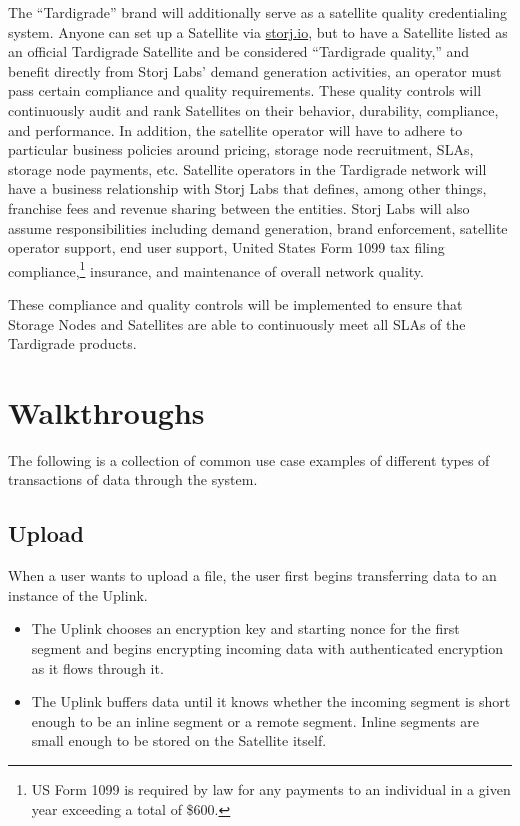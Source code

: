 \documentclass[8pt,fleqn,openany]{book}
\begin{document}
The ``Tardigrade'' brand will additionally serve as a satellite quality
credentialing system. Anyone can set up a Satellite via
\url{storj.io}, but to have a Satellite listed as an official Tardigrade
Satellite and be considered ``Tardigrade quality,'' and benefit directly from
Storj Labs' demand generation activities, an operator must pass
certain compliance and quality requirements.
These quality controls will continuously audit and rank Satellites on their
behavior, durability, compliance, and performance.
In addition, the satellite operator will have to adhere to particular business
policies around pricing, storage node recruitment, SLAs, storage node payments,
etc. Satellite operators in the Tardigrade network will have a business
relationship with Storj Labs that defines, among other things, franchise fees
and revenue sharing between the entities. Storj Labs will also assume
responsibilities including demand generation, brand enforcement, satellite
operator support, end user support, United States Form 1099 tax filing
compliance,\footnote{US Form 1099 is required by law for any payments to an
individual in a given year exceeding a total of \$600.}
insurance, and maintenance of overall network quality.

These compliance and quality controls will be implemented to ensure that
Storage Nodes and Satellites are able to continuously meet all SLAs of the
Tardigrade products.

\chapter{Walkthroughs}\label{chap:walkthroughs}

The following is a collection of common use case examples of different types of
transactions of data through the system.

\section{Upload}

When a user wants to upload a file, the user first begins transferring data to
an instance of the Uplink.

\begin{itemize}
\item The Uplink chooses an encryption key and starting nonce for
  the first segment and begins encrypting incoming data with authenticated
  encryption as it flows through it.
\item The Uplink buffers data until it knows whether the incoming segment is
short enough to be an inline segment or a remote segment. Inline segments are
small enough to be stored on the Satellite itself.
\end{itemize}
\end{document}
